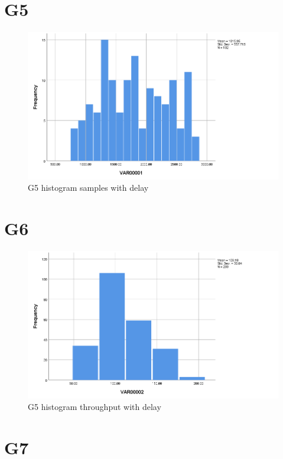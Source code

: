 \documentclass[hidelinks, 12pt, a4paper]{article}
\begin{document}
\section{G5}

\begin{figure}[h!]
	\centering
		\includegraphics[height=.38\textheight, width=\textwidth]{assets/session1/g5.png}
		\caption{G5 histogram samples with delay} 
	\end{figure}

\section{G6}

\begin{figure}[h!]
	\centering
		\includegraphics[height=.38\textheight, width=\textwidth]{assets/session1/g6.png}
		\caption{G5 histogram throughput with delay} 
	\end{figure}

\section{G7}
\end{document}
